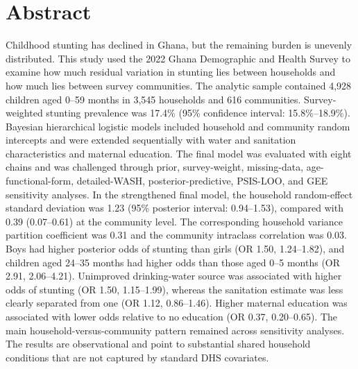 \chapter*{Abstract}
\begin{singlespace}
Childhood stunting has declined in Ghana, but the remaining burden is unevenly distributed. This study used the 2022 Ghana Demographic and Health Survey to examine how much residual variation in stunting lies between households and how much lies between survey communities. The analytic sample contained 4,928 children aged 0--59 months in 3,545 households and 616 communities. Survey-weighted stunting prevalence was 17.4\% (95\% confidence interval: 15.8\%--18.9\%). Bayesian hierarchical logistic models included household and community random intercepts and were extended sequentially with water and sanitation characteristics and maternal education. The final model was evaluated with eight chains and was challenged through prior, survey-weight, missing-data, age-functional-form, detailed-WASH, posterior-predictive, PSIS-LOO, and GEE sensitivity analyses. In the strengthened final model, the household random-effect standard deviation was 1.23 (95\% posterior interval: 0.94--1.53), compared with 0.39 (0.07--0.61) at the community level. The corresponding household variance partition coefficient was 0.31 and the community intraclass correlation was 0.03. Boys had higher posterior odds of stunting than girls (OR 1.50, 1.24--1.82), and children aged 24--35 months had higher odds than those aged 0--5 months (OR 2.91, 2.06--4.21). Unimproved drinking-water source was associated with higher odds of stunting (OR 1.50, 1.15--1.99), whereas the sanitation estimate was less clearly separated from one (OR 1.12, 0.86--1.46). Higher maternal education was associated with lower odds relative to no education (OR 0.37, 0.20--0.65). The main household-versus-community pattern remained across sensitivity analyses. The results are observational and point to substantial shared household conditions that are not captured by standard DHS covariates.
\end{singlespace}
\clearpage
